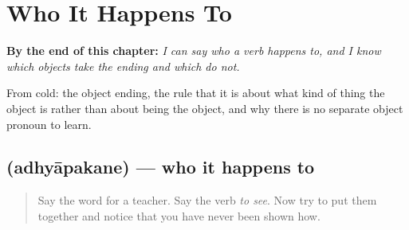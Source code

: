
\chapter{Who It Happens To}
\label{ch:ml-accusative}

\begin{chapteropening}
\textbf{By the end of this chapter:} \emph{I can say who a verb happens to, and I know which objects take the ending and which do not.}

From cold: the object ending, the rule that it is about what kind of thing the object is rather than about being the object, and why there is no separate object pronoun to learn.
\end{chapteropening}

\section[\texorpdfstring{\ml{അധ്യാപകനെ} (adhyāpakane)}{അധ്യാപകനെ (adhyāpakane)}]{ (adhyāpakane) — who it happens to}

\label{lesson:ML-C87-accusative}



\begin{quote}
Say the word for a teacher. Say the verb \emph{to see}. Now try to put them together and notice that you have never been shown how.
\end{quote}

